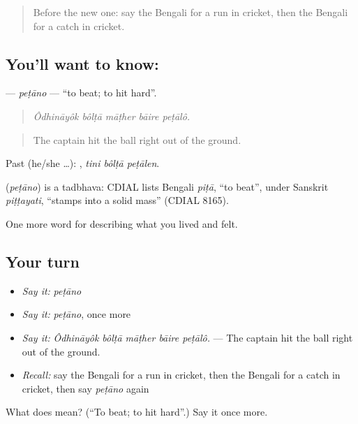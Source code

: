 \label{lesson:BN-C521-petano}



\begin{quote}
Before the new one: say the Bengali for a run in cricket, then the Bengali for a catch in cricket.
\end{quote}

\subsection*{You'll want to know: }
\textbf{} — \emph{peṭāno} — \textquotedblleft{}to beat; to hit hard\textquotedblright{}.

\begin{quote}
    
\end{quote}

\begin{quote}
\emph{Ôdhināyôk bôlṭā māṭher bāire peṭālô.}
\end{quote}

\begin{quote}
The captain hit the ball right out of the ground.
\end{quote}

Past (he/she …):   , \emph{tini bôlṭā peṭālen}.

\begin{cousinweb}
\textbf{} (\emph{peṭāno}) is a tadbhava: CDIAL lists Bengali \emph{piṭā}, \textquotedblleft{}to beat\textquotedblright{}, under Sanskrit \emph{piṭṭayati}, \textquotedblleft{}stamps into a solid mass\textquotedblright{} (CDIAL 8165).
\end{cousinweb}

\begin{grammarlens}[title={What you've built}]
One more word for describing what you lived and felt.
\end{grammarlens}

\subsection*{Your turn}
\begin{itemize}
\raggedright
  \item \emph{Say it:} \emph{peṭāno}
  \item \emph{Say it:} \emph{peṭāno}, once more
  \item \emph{Say it:} \emph{Ôdhināyôk bôlṭā māṭher bāire peṭālô.} — The captain hit the ball right out of the ground.
  \item \emph{Recall:} say the Bengali for a run in cricket, then the Bengali for a catch in cricket, then say \emph{peṭāno} again
\end{itemize}

\begin{tcolorbox}[breakable,colback=teal!4,colframe=teal!35!black,title={Before you move on}]
What does  mean? (\textquotedblleft{}To beat; to hit hard\textquotedblright{}.) Say it once more.
\end{tcolorbox}
